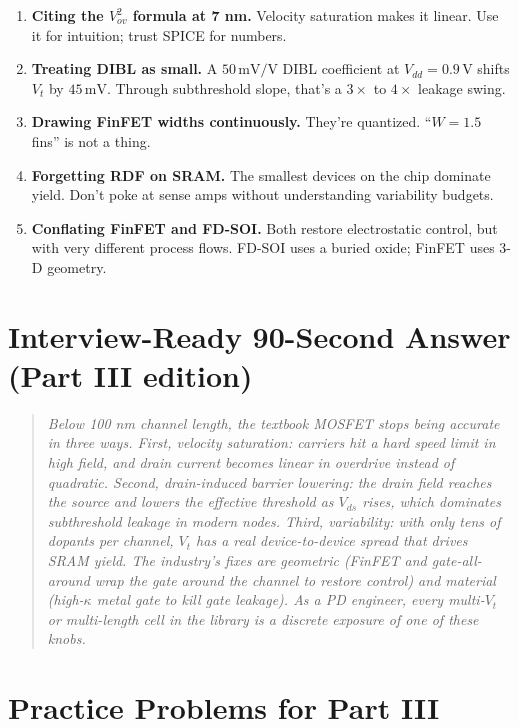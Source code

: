 \documentclass[11pt]{article}
\begin{document}
\begin{enumerate}
\item \textbf{Citing the $V_{ov}^2$ formula at 7 nm.} Velocity saturation makes it linear. Use it for intuition; trust SPICE for numbers.
\item \textbf{Treating DIBL as small.} A $50\,\text{mV/V}$ DIBL coefficient at $V_{dd} = 0.9\,\text{V}$ shifts $V_t$ by $45\,\text{mV}$. Through subthreshold slope, that's a $3\times$ to $4\times$ leakage swing.
\item \textbf{Drawing FinFET widths continuously.} They're quantized. ``$W = 1.5$ fins'' is not a thing.
\item \textbf{Forgetting RDF on SRAM.} The smallest devices on the chip dominate yield. Don't poke at sense amps without understanding variability budgets.
\item \textbf{Conflating FinFET and FD-SOI.} Both restore electrostatic control, but with very different process flows. FD-SOI uses a buried oxide; FinFET uses 3-D geometry.
\end{enumerate}

\section{Interview-Ready 90-Second Answer (Part III edition)}

\begin{quote}\itshape
Below 100 nm channel length, the textbook MOSFET stops being accurate in three ways. First, velocity saturation: carriers hit a hard speed limit in high field, and drain current becomes linear in overdrive instead of quadratic. Second, drain-induced barrier lowering: the drain field reaches the source and lowers the effective threshold as $V_{ds}$ rises, which dominates subthreshold leakage in modern nodes. Third, variability: with only tens of dopants per channel, $V_t$ has a real device-to-device spread that drives SRAM yield. The industry's fixes are geometric (FinFET and gate-all-around wrap the gate around the channel to restore control) and material (high-$\kappa$ metal gate to kill gate leakage). As a PD engineer, every multi-$V_t$ or multi-length cell in the library is a discrete exposure of one of these knobs.
\end{quote}

\section{Practice Problems for Part III}
\end{document}
